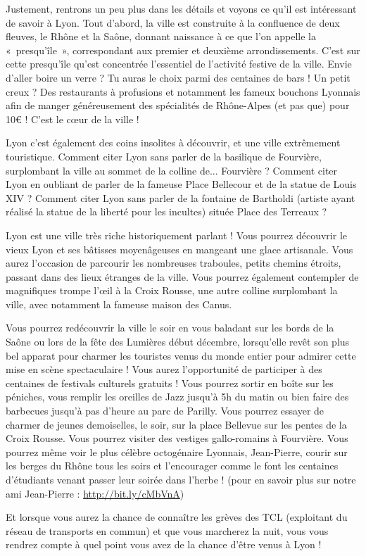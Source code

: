 \vspace{1em}

Justement, rentrons un peu plus dans les détails et voyons ce qu'il est
intéressant de savoir à Lyon. Tout d'abord, la ville est construite à la
confluence de deux fleuves, le Rhône et la Saône, donnant naissance à ce que
l'on appelle la «~presqu'île~», correspondant aux premier et deuxième arrondissements.
C'est sur cette presqu'île qu'est concentrée l'essentiel de l'activité festive
de la ville. Envie d'aller boire un verre ? Tu auras le choix parmi des
centaines de bars ! Un petit creux ? Des restaurants à profusions et notamment
les fameux bouchons Lyonnais afin de manger généreusement des spécialités de
Rhône-Alpes (et pas que) pour 10€ ! C'est le cœur de la ville !

\vspace{1em}

Lyon c'est également des coins insolites à découvrir, et une ville extrêmement
touristique. Comment citer Lyon sans parler de la basilique de Fourvière,
surplombant la ville au sommet de la colline de... Fourvière ? Comment citer
Lyon en oubliant de parler de la fameuse Place Bellecour et de la statue de
Louis XIV ? Comment citer Lyon sans parler de la fontaine de Bartholdi (artiste
ayant réalisé la statue de la liberté pour les incultes) située
Place des Terreaux ?

\vspace{1em}

Lyon est une ville très riche historiquement parlant ! Vous pourrez découvrir le
vieux Lyon et ses bâtisses moyenâgeuses en mangeant une glace artisanale. Vous
aurez l'occasion de parcourir les nombreuses traboules, petits chemins étroits, passant dans
des lieux étranges de la ville. Vous
pourrez également contempler de magnifiques trompe l'œil à la Croix Rousse, une
autre colline surplombant la ville, avec notamment la fameuse maison des Canus.

\vspace{1em}

Vous pourrez redécouvrir la ville le soir en vous
baladant sur les bords de la Saône ou lors de la fête des Lumières début décembre,
lorsqu'elle revêt son plus bel apparat pour charmer les touristes
venus du monde entier pour admirer cette mise en scène spectaculaire !
Vous aurez l'opportunité de participer à des centaines de festivals culturels gratuits
! Vous pourrez sortir en boîte sur les péniches, vous remplir les
oreilles de Jazz jusqu'à 5h du matin ou bien faire des barbecues
jusqu'à pas d'heure au parc de Parilly. Vous pourrez essayer de
charmer de jeunes demoiselles, le soir, sur la place Bellevue sur les
pentes de la Croix Rousse. Vous pourrez visiter des vestiges gallo-romains
à Fourvière. Vous pourrez même voir le plus célèbre octogénaire
Lyonnais, Jean-Pierre, courir sur les berges du Rhône tous les soirs et
l'encourager comme le font les centaines d'étudiants venant passer leur
soirée dans l'herbe ! (pour en savoir plus sur notre ami Jean-Pierre : \url{http://bit.ly/cMbVnA})

\vspace{1em}

Et lorsque vous aurez la chance de connaître les grèves des TCL (exploitant du
réseau de transports en commun) et que vous marcherez la nuit, vous vous
rendrez compte à quel point vous avez de la chance d'être venus à Lyon !

